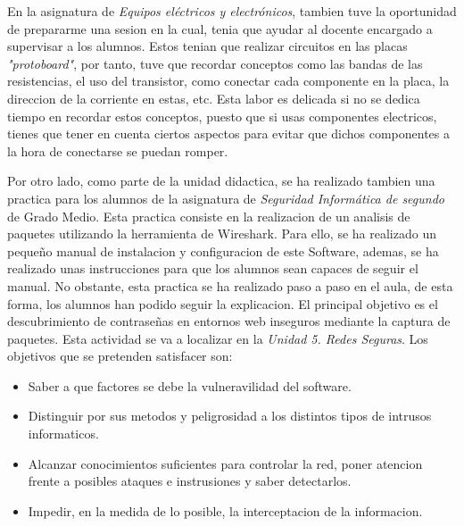 \documentclass[spanish,12pt, a4paper,twoside]{paper}
\begin{document}
\justify
En la asignatura de \textit{Equipos eléctricos y electrónicos}, tambien tuve la oportunidad de prepararme una sesion en la cual, tenia que ayudar al docente encargado a supervisar a los alumnos. Estos tenian que realizar circuitos en las placas \textit{"protoboard"}, por tanto, tuve que recordar conceptos como las bandas de las resistencias, el uso del transistor, como conectar cada componente en la placa, la direccion de la corriente en estas, etc. Esta labor es delicada si no se dedica tiempo en recordar estos conceptos, puesto que si usas componentes electricos, tienes que tener en cuenta ciertos aspectos para evitar que dichos componentes a la hora de conectarse se puedan romper.

\justify
Por otro lado, como parte de la unidad didactica, se ha realizado tambien una practica para los alumnos de la asignatura de \textit{Seguridad Informática de segundo} de Grado Medio. Esta practica consiste en la realizacion de un analisis de paquetes utilizando la herramienta de Wireshark. Para ello, se ha realizado un pequeño manual de instalacion y configuracion de este Software, ademas, se ha realizado unas instrucciones para que los alumnos sean capaces de seguir el manual. No obstante, esta practica se ha realizado paso a paso en el aula, de esta forma, los alumnos han podido seguir la explicacion. El principal objetivo es el descubrimiento de contraseñas en entornos web inseguros mediante la captura de paquetes. Esta actividad se va a localizar en la \textit{Unidad 5. Redes Seguras}. Los objetivos que se pretenden satisfacer son:
\begin{itemize}
\item Saber a que factores se debe la vulneravilidad del software.
\item Distinguir por sus metodos y peligrosidad a los distintos tipos de intrusos informaticos.
\item Alcanzar conocimientos suficientes para controlar la red, poner atencion frente a posibles ataques e instrusiones y saber detectarlos.
\item Impedir, en la medida de lo posible, la interceptacion de la informacion.
\end{itemize}
\end{document}
